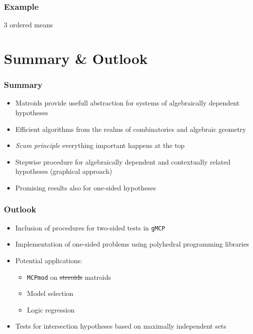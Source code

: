 \documentclass[bigger]{beamer}
\newcommand{\parentd}{../}
\begin{document}
\begin{frame}
 \frametitle{Example}
 3 ordered means
\end{frame}

\section{Summary \& Outlook}



\begin{frame}
\frametitle{Summary}
\begin{itemize}
\item Matroids provide usefull abstraction for systems of algebraically dependent hypotheses
\item Efficient algorithms from the realms of combinatorics and algebraic geometry
\item {\em Scum principle} everything important happens at the top
\item Stepwise procedure for algebraically dependent and contextually
  related hypotheses (graphical approach)
\item Promising results also for one-sided hypotheses
\end{itemize}
\end{frame}



\begin{frame}
\frametitle{Outlook}
\begin{itemize}
\item Inclusion of procedures for two-sided tests in \texttt{gMCP} 
\item Implementation of one-sided problems using polyhedral
  programming libraries
\item Potential applications:
  \begin{itemize}
  \item \texttt{MCPmod} on \sout{steroids} matroids
  \item Model selection
  \item Logic regression
  \end{itemize}
\item Tests for intersection hypotheses based on maximally independent
  sets 
\end{itemize}
\end{frame}



\end{document}
